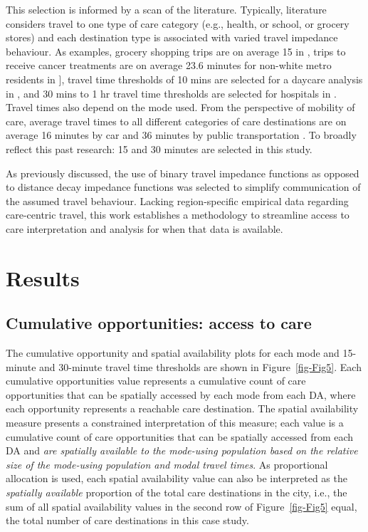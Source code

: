\documentclass[
  authoryear,
  preprint,
  3p]{elsarticle}
\begin{document}
This selection is informed by a scan of the literature. Typically,
literature considers travel to one type of care category (e.g., health,
or school, or grocery stores) and each destination type is associated
with varied travel impedance behaviour. As examples, grocery shopping
trips are on average 15 in \citet{hamrickTimeCostAccess2012}, trips to
receive cancer treatments are on average 23.6 minutes for non-white
metro residents in \citet{segelRuralurbanDifferencesAssociation2020}{]},
travel time thresholds of 10 mins are selected for a daycare analysis in
\citet{fransenCommuterbasedTwostepFloating2015}, and 30 mins to 1 hr
travel time thresholds are selected for hospitals in
\citet{schuurmanDefiningRationalHospital2006}. Travel times also depend
on the mode used. From the perspective of mobility of care, average
travel times to all different categories of care destinations are on
average 16 minutes by car and 36 minutes by public transportation
\citep{ravensbergenExploratoryAnalysisMobility2022}. To broadly reflect
this past research: 15 and 30 minutes are selected in this study.

As previously discussed, the use of binary travel impedance functions as
opposed to distance decay impedance functions was selected to simplify
communication of the assumed travel behaviour. Lacking region-specific
empirical data regarding care-centric travel, this work establishes a
methodology to streamline access to care interpretation and analysis for
when that data is available.

\section{Results}\label{results}

\subsection{Cumulative opportunities: access to
care}\label{cumulative-opportunities-access-to-care}

The cumulative opportunity and spatial availability plots for each mode
and 15-minute and 30-minute travel time thresholds are shown in
Figure~\ref{fig-Fig5}. Each cumulative opportunities value represents a
cumulative count of care opportunities that can be spatially accessed by
each mode from each DA, where each opportunity represents a reachable
care destination. The spatial availability measure presents a
constrained interpretation of this measure; each value is a cumulative
count of care opportunities that can be spatially accessed from each DA
and \emph{are spatially available to the mode-using population based on
the relative size of the mode-using population and modal travel times}.
As proportional allocation is used, each spatial availability value can
also be interpreted as the \emph{spatially available} proportion of the
total care destinations in the city, i.e., the sum of all spatial
availability values in the second row of Figure~\ref{fig-Fig5} equal,
the total number of care destinations in this case study.
\end{document}
